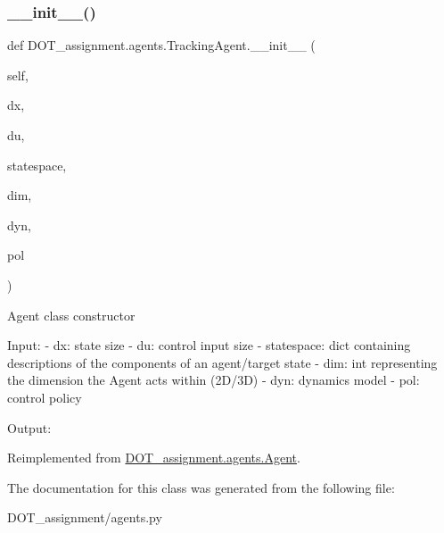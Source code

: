 \subsubsection{\texorpdfstring{\_\_init\_\_()}{\_\_init\_\_()}}
{\footnotesize\ttfamily def D\+O\+T\+\_\+assignment.\+agents.\+Tracking\+Agent.\+\_\+\+\_\+init\+\_\+\+\_\+ (\begin{DoxyParamCaption}\item[{}]{self,  }\item[{}]{dx,  }\item[{}]{du,  }\item[{}]{statespace,  }\item[{}]{dim,  }\item[{}]{dyn,  }\item[{}]{pol }\end{DoxyParamCaption})}

\begin{DoxyVerb}Agent class constructor

Input:
- dx:                   state size
- du:                   control input size
- statespace:           dict containing descriptions of the components of an agent/target state
- dim:                  int representing the dimension the Agent acts within (2D/3D)
- dyn:                  dynamics model
- pol:                  control policy

Output:\end{DoxyVerb}
 

Reimplemented from \mbox{\hyperlink{class_d_o_t__assignment_1_1agents_1_1_agent_a243feb66a55d2a2733464276db763fc3}{D\+O\+T\+\_\+assignment.\+agents.\+Agent}}.



The documentation for this class was generated from the following file\+:\begin{DoxyCompactItemize}
\item 
D\+O\+T\+\_\+assignment/agents.\+py\end{DoxyCompactItemize}
